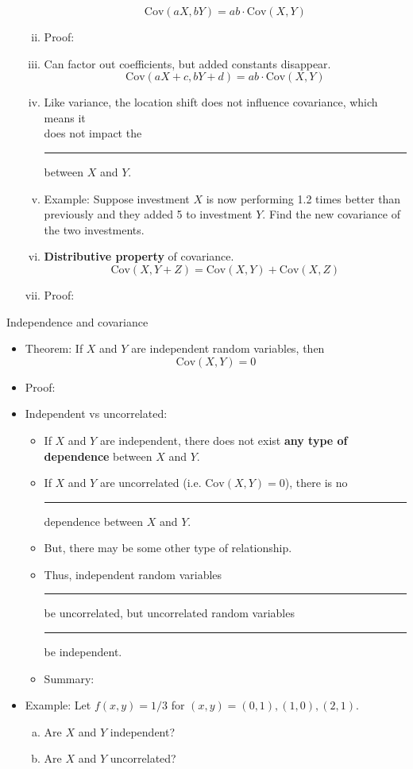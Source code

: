 \documentclass{article}
\newcommand{\blankul}[1]{\rule[-1.5mm]{#1}{0.15mm}}	%
\newcommand{\cov}[1]{\mathrm{Cov}(#1)}		%
\begin{document}
\begin{itemize}
\begin{enumerate}[(i)]
        \[\cov{aX,bY} = ab \cdot \cov{X,Y}\]
        \item[] Proof:\vspace{80pt}
        \item Can factor out coefficients, but added constants disappear.
        \[\cov{aX + c,bY + d} = ab \cdot \cov{X,Y}\]
        \item[] Like variance, the location shift does not influence covariance, which means it \\does not impact the \blankul{4cm} between $X$ and $Y$.
        \item[] Example: Suppose investment $X$ is now performing 1.2 times better than previously and they added 5 to investment $Y$. Find the new covariance of the two investments.\vspace{20pt}
        \item \textbf{Distributive property} of covariance.
        \[\cov{X, Y + Z} = \cov{X,Y} + \cov{X,Z}\]
        \item[] Proof:\vspace{100pt}
    \end{enumerate}
\end{itemize}\bigskip

Independence and covariance\bigskip
\begin{itemize}
    \item Theorem: If $X$ and $Y$ are independent random variables, then
    \[\cov{X,Y} = 0\]
    \item Proof:\vspace{100pt}
    \item Independent vs uncorrelated:
    \begin{itemize}
        \item If $X$ and $Y$ are independent, there does not exist \textbf{any type of dependence} between $X$ and $Y$.
        \item If $X$ and $Y$ are uncorrelated (i.e. $\cov{X,Y} = 0$), there is no \blankul{2cm} dependence between $X$ and $Y$.
        \item[] But, there may be some other type of relationship.
        \item Thus, independent random variables \blankul{1cm} be uncorrelated, but uncorrelated random variables \blankul{2cm} be independent.
        \item[] Summary:\vspace{100pt}
    \end{itemize}
    \item Example: Let $f(x,y) = 1/3$ \quad for $(x,y) = (0,1), (1,0), (2,1)$.\vspace{20pt}
    \begin{enumerate}[(a)]
        \item Are $X$ and $Y$ independent?\vspace{50pt}
        \item Are $X$ and $Y$ uncorrelated?\vspace{100pt}
    \end{enumerate}
\end{itemize}\bigskip
\end{document}
